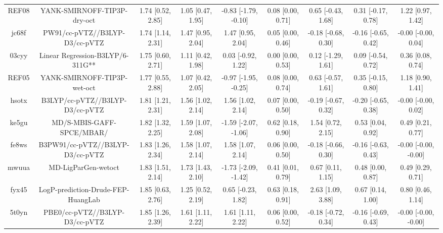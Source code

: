 \documentclass{article}
\begin{document}
\begin{center}
\begin{longtable}{|ccccccccc|}
 REF08 &                        YANK-SMIRNOFF-TIP3P-dry-oct &  1.74 [0.52, 2.85] &  1.05 [0.47, 1.95] &  -0.83 [-1.79, -0.10] &  0.08 [0.00, 0.71] &   0.65 [-0.43, 1.68] &   0.31 [-0.17, 0.78] &     1.22 [0.97, 1.42] \\
 jc68f &                     PW91/cc-pVTZ//B3LYP-D3/cc-pVTZ &  1.74 [1.14, 2.31] &  1.47 [0.95, 2.04] &     1.47 [0.95, 2.04] &  0.05 [0.00, 0.46] &  -0.18 [-0.68, 0.30] &  -0.16 [-0.65, 0.42] &   -0.00 [-0.00, 0.04] \\
 03cyy &                   Linear Regression-B3LYP/6-311G** &  1.75 [0.60, 2.71] &  1.11 [0.42, 1.98] &    0.03 [-0.92, 1.22] &  0.00 [0.00, 0.53] &   0.12 [-1.29, 1.61] &   0.09 [-0.54, 0.72] &     0.36 [0.08, 0.74] \\
 REF05 &                        YANK-SMIRNOFF-TIP3P-wet-oct &  1.77 [0.55, 2.88] &  1.07 [0.42, 2.05] &  -0.97 [-1.95, -0.25] &  0.08 [0.00, 0.74] &   0.63 [-0.57, 1.61] &   0.35 [-0.15, 0.80] &     1.18 [0.90, 1.41] \\
 hsotx &                    B3LYP/cc-pVTZ//B3LYP-D3/cc-pVTZ &  1.81 [1.21, 2.31] &  1.56 [1.02, 2.14] &     1.56 [1.02, 2.14] &  0.07 [0.00, 0.50] &  -0.19 [-0.67, 0.32] &  -0.20 [-0.65, 0.38] &   -0.00 [-0.00, 0.02] \\
 ke5gu &                          MD/S-MBIS-GAFF-SPCE/MBAR/ &  1.82 [1.32, 2.25] &  1.59 [1.07, 2.08] &  -1.59 [-2.07, -1.06] &  0.62 [0.18, 0.90] &    1.54 [0.72, 2.15] &    0.53 [0.04, 0.92] &     0.49 [0.21, 0.77] \\
 fe8ws &                   B3PW91/cc-pVTZ//B3LYP-D3/cc-pVTZ &  1.83 [1.26, 2.34] &  1.58 [1.07, 2.14] &     1.58 [1.07, 2.14] &  0.06 [0.00, 0.50] &  -0.18 [-0.66, 0.30] &  -0.16 [-0.63, 0.43] &  -0.00 [-0.00, -0.00] \\
 mwuua &                                MD-LigParGen-wetoct &  1.83 [1.51, 2.14] &  1.73 [1.43, 2.10] &  -1.73 [-2.09, -1.42] &  0.41 [0.01, 0.79] &    0.67 [0.11, 1.15] &    0.48 [0.00, 0.87] &     0.49 [0.29, 0.71] \\
 fyx45 &                 LogP-prediction-Drude-FEP-HuangLab &  1.85 [0.63, 2.76] &  1.25 [0.52, 2.19] &    0.65 [-0.23, 1.82] &  0.63 [0.18, 0.91] &    2.63 [1.09, 3.88] &    0.67 [0.14, 1.00] &     0.80 [0.46, 1.14] \\
 5t0yn &                     PBE0/cc-pVTZ//B3LYP-D3/cc-pVTZ &  1.85 [1.26, 2.39] &  1.61 [1.11, 2.22] &     1.61 [1.11, 2.22] &  0.06 [0.00, 0.52] &  -0.18 [-0.72, 0.34] &  -0.16 [-0.69, 0.43] &  -0.00 [-0.00, -0.00] \\

\end{longtable}
\end{center}
\end{document}
